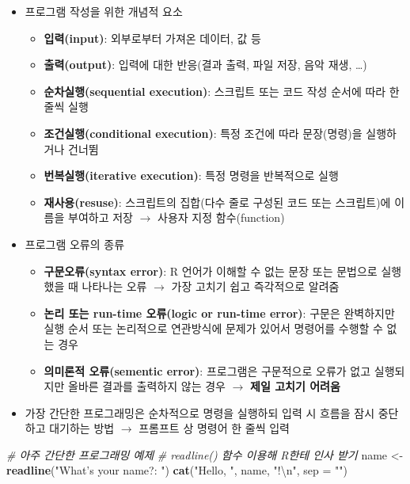 \documentclass[
  11pt,
]{krantz}
\newenvironment{Shaded}{\begin{snugshade}}{\end{snugshade}}
\newcommand{\CharTok}[1]{\textcolor[rgb]{0.5,0.5,0.5}{#1}}
\newcommand{\CommentTok}[1]{\textcolor[rgb]{0.37,0.37,0.37}{\textit{#1}}}
\newcommand{\DataTypeTok}[1]{\textcolor[rgb]{0.27,0.27,0.27}{#1}}
\newcommand{\KeywordTok}[1]{\textcolor[rgb]{0.27,0.27,0.27}{\textbf{#1}}}
\newcommand{\NormalTok}[1]{#1}
\newcommand{\StringTok}[1]{\textcolor[rgb]{0.5,0.5,0.5}{#1}}
\providecommand{\tightlist}{%
  \setlength{\itemsep}{0pt}\setlength{\parskip}{0pt}}
\begin{document}
\normalsize

\begin{itemize}
\tightlist
\item
  프로그램 작성을 위한 개념적 요소

  \begin{itemize}
  \tightlist
  \item
    \textbf{입력(input)}: 외부로부터 가져온 데이터, 값 등
  \item
    \textbf{출력(output)}: 입력에 대한 반응(결과 출력, 파일 저장, 음악 재생, \ldots)
  \item
    \textbf{순차실행(sequential execution)}: 스크립트 또는 코드 작성 순서에 따라 한줄씩 실행
  \item
    \textbf{조건실행(conditional execution)}: 특정 조건에 따라 문장(명령)을 실행하거나 건너뜀
  \item
    \textbf{번복실행(iterative execution)}: 특정 명령을 반복적으로 실행
  \item
    \textbf{재사용(resuse)}: 스크립트의 집합(다수 줄로 구성된 코드 또는 스크립트)에 이름을 부여하고 저장 \(\rightarrow\) 사용자 지정 함수(function)
  \end{itemize}
\item
  프로그램 오류의 종류

  \begin{itemize}
  \tightlist
  \item
    \textbf{구문오류(syntax error)}: R 언어가 이해할 수 없는 문장 또는 문법으로 실행했을 때 나타나는 오류 \(\rightarrow\) 가장 고치기 쉽고 즉각적으로 알려줌
  \item
    \textbf{논리 또는 run-time 오류(logic or run-time error)}: 구문은 완벽하지만 실행 순서 또는 논리적으로 연관방식에 문제가 있어서 명령어를 수행할 수 없는 경우
  \item
    \textbf{의미론적 오류(sementic error)}: 프로그램은 구문적으로 오류가 없고 실행되지만 올바른 결과를 출력하지 않는 경우 \(\rightarrow\) \textbf{제일 고치기 어려움}
  \end{itemize}
\item
  가장 간단한 프로그래밍은 순차적으로 명령을 실행하되 입력 시 흐름을 잠시 중단하고 대기하는 방법 \(\rightarrow\) 프롬프트 상 명령어 한 줄씩 입력
\end{itemize}

\footnotesize

\begin{Shaded}
\begin{Highlighting}[]
\CommentTok{# 아주 간단한 프로그래밍 예제}
\CommentTok{# readline() 함수 이용해 R한테 인사 받기}
\NormalTok{name <-}\StringTok{ }\KeywordTok{readline}\NormalTok{(}\StringTok{"What's your name?: "}\NormalTok{)}
\KeywordTok{cat}\NormalTok{(}\StringTok{"Hello, "}\NormalTok{, name, }\StringTok{"!}\CharTok{\textbackslash{}n}\StringTok{"}\NormalTok{, }\DataTypeTok{sep =} \StringTok{""}\NormalTok{)}
\end{Highlighting}
\end{Shaded}
\end{document}
